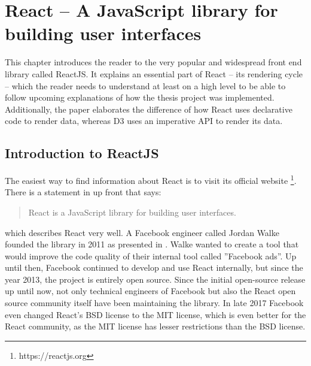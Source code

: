 \chapter{React – A JavaScript library for building user interfaces}
\label{cha:react}

This chapter introduces the reader to the very popular and widespread front end library called ReactJS. It explains an essential part of React -- its rendering cycle -- which the reader needs to understand at least on a high level to be able to follow upcoming explanations of how the thesis project was implemented. Additionally, the paper elaborates the difference of how React uses declarative code to render data, whereas D3 uses an imperative API to render its data.

\section{Introduction to ReactJS}
\label{sec:reactIntro}

The easiest way to find information about React is to visit its official website \footnote{https://reactjs.org}. There is a statement in \cite{React} up front that says: \begin{quote}\begin{english}React is a JavaScript library for building user interfaces.\end{english}\end{quote} which describes React very well. A Facebook engineer called Jordan Walke founded the library in 2011 as presented in \cite[05:30]{ReactFoundingVideo}. Walke wanted to create a tool that would improve the code quality of their internal tool called ''Facebook ads''. Up until then, Facebook continued to develop and use React internally, but since the year 2013, the project is entirely open source. Since the initial open-source release up until now, not only technical engineers of Facebook but also the React open source community itself have been maintaining the library. In late 2017 Facebook even changed React's BSD license to the MIT license, which is even better for the React community, as the MIT license has lesser restrictions than the BSD license.

